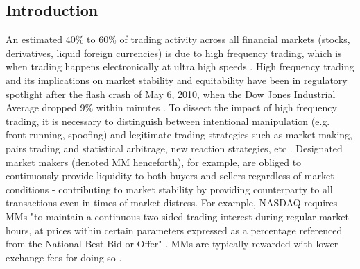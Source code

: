\documentclass[sigconf]{acmart}
\begin{document}
\subsection{Introduction}
{

An estimated 40\% to 60\% of trading activity across all financial markets (stocks, derivatives, liquid foreign currencies) is due to high frequency trading, which is when trading happens electronically at ultra high speeds \cite{kirilenko_lo}. High frequency trading and its implications on market stability and equitability have been in regulatory spotlight after the flash crash of May 6, 2010, when the Dow Jones Industrial Average dropped 9\% within minutes \cite{kirilenko_flash_crash}.
To dissect the impact of high frequency trading, it is necessary to distinguish between intentional manipulation (e.g. front-running, spoofing) and legitimate trading strategies such as market making, pairs trading and statistical arbitrage, new reaction strategies, etc \cite{high_freq_fairness}. Designated market makers (denoted MM henceforth), for example, are obliged to continuously provide liquidity to both buyers and sellers regardless of market conditions - contributing to market stability by providing counterparty to all transactions even in times of market distress. For example, NASDAQ requires MMs "to maintain a continuous two-sided trading interest during regular market hours, at prices within certain parameters expressed as a percentage referenced from the National Best Bid or Offer" \cite{NASDAQ_SEC}. MMs are typically rewarded with lower exchange fees for doing so \cite{Foucault_fees}. %

}
\end{document}
